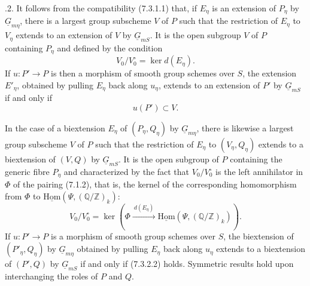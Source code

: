 
\medskip
{}.2.  It follows from the compatibility (7.3.1.1) that, if
$E_\eta$ is an extension of $P_\eta$ by $\underline G_{m\eta}$, there is a
largest group subscheme $V$ of $P$ such that the restriction of $E_\eta$ to
$V_\eta$ extends to an extension of $V$ by $\underline G_{mS}$.  It is the
open subgroup $V$ of $P$ containing $P_\eta$ and defined by the condition
\begin{equation}\tag{7.3.2.1}
 V_0/V_0^{\circ}=\ker d(E_\eta).
\end{equation}
If $u:P'\to P$ is then a morphism of smooth group schemes over $S$, the
extension $E'_\eta$, obtained by pulling $E_\eta$ back along $u_\eta$,
extends to an extension of $P'$ by $\underline G_{mS}$ if and only if
\begin{equation}\tag{7.3.2.2}
 u(P')\subset V.
\end{equation}

In the case of a biextension $E_\eta$ of $(P_\eta,Q_\eta)$ by
$\underline G_{m\eta}$, there is likewise a largest group subscheme $V$ of
$P$ such that the restriction of $E_\eta$ to $(V_\eta,Q_\eta)$ extends to
a biextension of $(V,Q)$ by $\underline G_{mS}$.  It is the open subgroup
of $P$ containing the generic fibre $P_\eta$ and characterized by the fact
that $V_0/V_0^{\circ}$ is the left annihilator in $\Phi$ of the pairing
(7.1.2), that is, the kernel of the corresponding homomorphism from $\Phi$
to $\underline{\mathrm{Hom}}(\Psi,(\mathbb Q/\mathbb Z)_k)$:
\begin{equation}\tag{7.3.2.3}
 V_0/V_0^{\circ}
 =\ker\!\left(
   \Phi\xrightarrow{\ d(E_\eta)\ }
   \underline{\mathrm{Hom}}(\Psi,(\mathbb Q/\mathbb Z)_k)
 \right).
\end{equation}
If $u:P'\to P$ is a morphism of smooth group schemes over $S$, the
biextension of $(P'_\eta,Q_\eta)$ by $\underline G_{m\eta}$ obtained by
pulling $E_\eta$ back along $u_\eta$ extends to a biextension of $(P',Q)$
by $\underline G_{mS}$ if and only if (7.3.2.2) holds.  Symmetric results
hold upon interchanging the roles of $P$ and $Q$.

